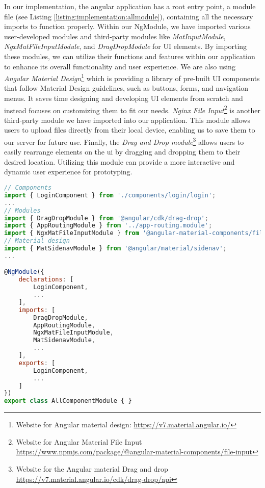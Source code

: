 In our implementation, the angular application has a root entry point, a module file (see Listing \ref{listing:implementation:allmodule}), containing all the necessary imports to function properly. 
Within our NgModule, we have imported various user-developed modules and third-party modules like \textit{MatInputModule}, \textit{NgxMatFileInputModule}, and \textit{DragDropModule} for UI elements. 
By importing these modules, we can utilize their functions and features within our application to enhance its overall functionality and user experience.
We are also using \textit{Angular Material Design}\footnote{Website for Angular material design: \url{https://v7.material.angular.io/}} which is providing a library of pre-built UI components that follow Material Design guidelines, such as buttons, forms, and navigation menus. 
It saves time designing and developing UI elements from scratch and instead focuses on customizing them to fit our needs.
\textit{Nginx File Input}\footnote{Website for Angular Material File Input \url{https://www.npmjs.com/package/@angular-material-components/file-input}} is another third-party module we have imported into our application. 
This module allows users to upload files directly from their local device, enabling us to save them to our server for future use.
Finally, the \textit{Drag and Drop module}\footnote{Website for the Angular material Drag and drop \url{https://v7.material.angular.io/cdk/drag-drop/api}} allows users to easily rearrange elements on the \ac{ui} by dragging and dropping them to their desired location. 
Utilizing this module can provide a more interactive and dynamic user experience for prototyping.

\begin{lstlisting}[language=JavaScript, caption=all-component.module.ts, label=listing:implementation:allmodule]
// Components
import { LoginComponent } from './components/login/login';
...
// Modules
import { DragDropModule } from '@angular/cdk/drag-drop';
import { AppRoutingModule } from '../app-routing.module';
import { NgxMatFileInputModule } from '@angular-material-components/file-input';
// Material design
import { MatSidenavModule } from '@angular/material/sidenav';
...

@NgModule({
    declarations: [
        LoginComponent,
        ...
    ],
    imports: [
        DragDropModule,
        AppRoutingModule,
        NgxMatFileInputModule,
        MatSidenavModule,
        ...
    ],
    exports: [
        LoginComponent, 
        ...
    ]
})
export class AllComponentModule { }  
\end{lstlisting}

